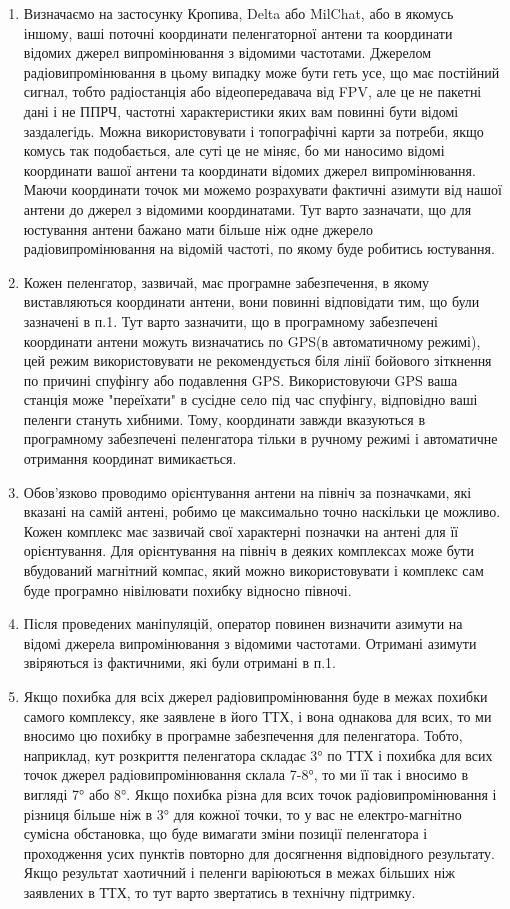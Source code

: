\documentclass{article}
\begin{document}
\begin{enumerate}[noitemsep, topsep=8pt]
	\item Визначаємо на застосунку Кропива, Delta або MilChat, або в якомусь іншому, ваші поточні координати пеленгаторної антени та координати відомих джерел випромінювання з відомими частотами. Джерелом радіовипромінювання в цьому випадку може бути геть усе, що має постійний сигнал, тобто радіостанція або відеопередавача від FPV, але це не пакетні дані і не ППРЧ, частотні характеристики яких вам повинні бути відомі заздалегідь. Можна використовувати і топографічні карти за потреби, якщо комусь так подобається, але суті це не міняє, бо ми наносимо відомі координати вашої антени та координати відомих джерел випромінювання. Маючи координати точок ми можемо розрахувати фактичні азимути від нашої антени до джерел з відомими координатами. Тут варто зазначати, що для юстування антени бажано мати більше ніж одне джерело радіовипромінювання на відомій частоті, по якому буде робитись юстування.
	\item Кожен пеленгатор, зазвичай, має програмне забезпечення, в якому виставляються координати антени, вони повинні відповідати тим, що були зазначені в п.1. Тут варто зазначити, що в програмному забезпечені координати антени можуть визначатись по GPS(в автоматичному режимі), цей режим використовувати не рекомендується біля лінії бойового зіткнення по причині спуфінгу або подавлення GPS. Використовуючи GPS ваша станція може "переїхати" в сусідне село під час спуфінгу, відповідно ваші пеленги стануть хибними. Тому, координати завжди вказуються в програмному забезпечені пеленгатора тільки в ручному режимі і автоматичне отримання координат вимикається.
	\item Обов'язково проводимо орієнтування антени на північ за позначками, які вказані на самій антені, робимо це максимально точно наскільки це можливо. Кожен комплекс має зазвичай свої характерні позначки на антені для її орієнтування. Для орієнтування на північ в деяких комплексах може бути вбудований магнітний компас, який можно використовувати і комплекс сам буде програмно нівілювати похибку відносно півночі.
	\item Після проведених маніпуляцій, оператор повинен визначити азимути на відомі джерела випромінювання з відомими частотами. Отримані азимути звіряються із фактичними, які були отримані в п.1. 
	\item Якщо похибка для всіх джерел радіовипромінювання буде в межах похибки самого комплексу, яке заявлене в його ТТХ, і вона однакова для всих, то ми вносимо цю похибку в програмне забезпечення для пеленгатора. Тобто, наприклад, кут розкриття пеленгатора складає 3° по ТТХ і похибка для всих точок джерел радіовипромінювання склала 7-8°, то ми її так і вносимо в вигляді 7° або 8°. Якщо похибка різна для всих точок радіовипромінювання і різниця більше ніж в 3° для кожної точки, то у вас не електро-магнітно сумісна обстановка, що буде вимагати зміни позиції пеленгатора і проходження усих пунктів повторно для досягнення відповідного результату. Якщо результат хаотичний і пеленги варіюються в межах більших ніж заявлених в ТТХ, то тут варто звертатись в технічну підтримку.
\end{enumerate}
\end{document}
